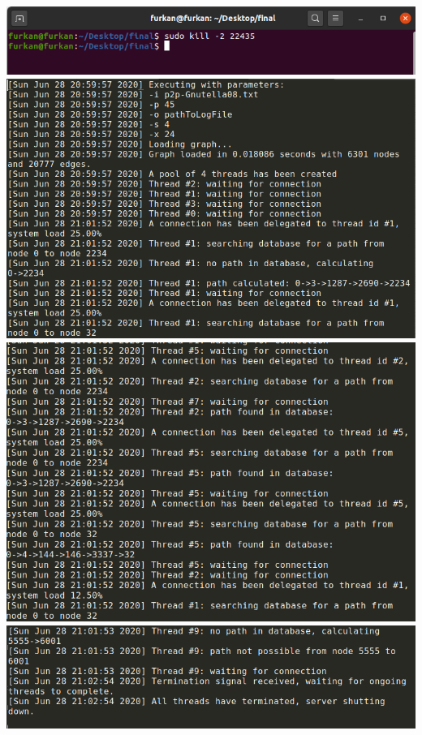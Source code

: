 \documentclass{article}
\begin{document}
\includegraphics[width=\textwidth]{5.png} \newline
\includegraphics[width=\textwidth]{6.png} \newline
\includegraphics[width=\textwidth]{7.png} \newline
\includegraphics[width=\textwidth]{8.png} \newline
\end{document}
